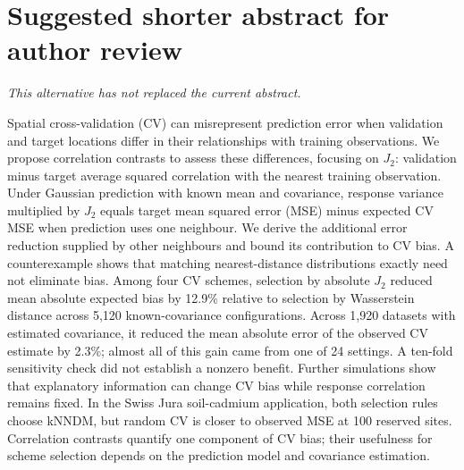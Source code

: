 \documentclass[11pt,a4paper]{article}
\begin{document}
\section*{Suggested shorter abstract for author review}
\noindent\textit{This alternative has not replaced the current abstract.}

Spatial cross-validation (CV) can misrepresent prediction error when validation and target locations differ in their relationships with training observations. We propose correlation contrasts to assess these differences, focusing on $J_2$: validation minus target average squared correlation with the nearest training observation. Under Gaussian prediction with known mean and covariance, response variance multiplied by $J_2$ equals target mean squared error (MSE) minus expected CV MSE when prediction uses one neighbour. We derive the additional error reduction supplied by other neighbours and bound its contribution to CV bias. A counterexample shows that matching nearest-distance distributions exactly need not eliminate bias. Among four CV schemes, selection by absolute $J_2$ reduced mean absolute expected bias by 12.9\% relative to selection by Wasserstein distance across 5,120 known-covariance configurations. Across 1,920 datasets with estimated covariance, it reduced the mean absolute error of the observed CV estimate by 2.3\%; almost all of this gain came from one of 24 settings. A ten-fold sensitivity check did not establish a nonzero benefit. Further simulations show that explanatory information can change CV bias while response correlation remains fixed. In the Swiss Jura soil-cadmium application, both selection rules choose kNNDM, but random CV is closer to observed MSE at 100 reserved sites. Correlation contrasts quantify one component of CV bias; their usefulness for scheme selection depends on the prediction model and covariance estimation.
\end{document}
